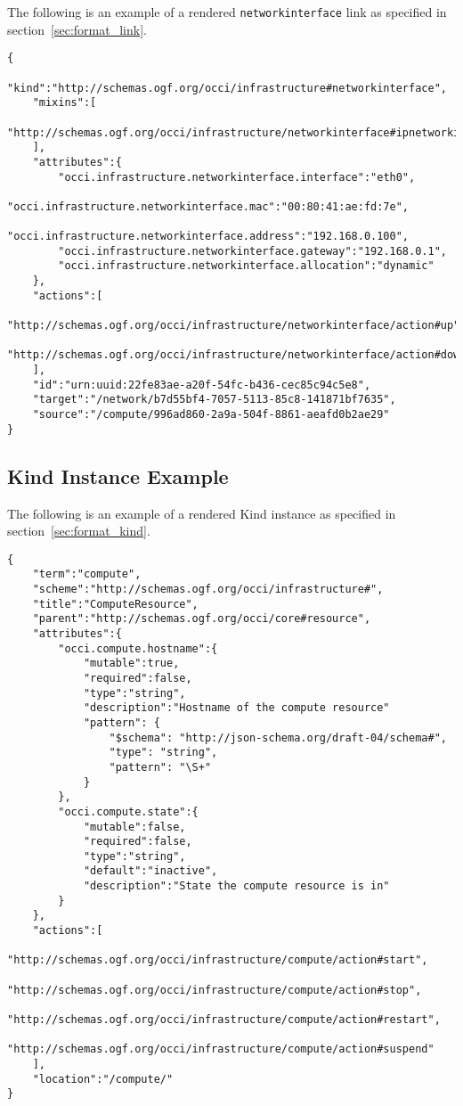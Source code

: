 \documentclass[10pt,a4paper]{article}
\begin{document}
\begin{appendices}
The following is an example of a rendered \texttt{networkinterface} link as specified in section~\ref{sec:format_link}.


\begin{lstlisting}
{
    "kind":"http://schemas.ogf.org/occi/infrastructure#networkinterface",
    "mixins":[
        "http://schemas.ogf.org/occi/infrastructure/networkinterface#ipnetworkinterface"
    ],
    "attributes":{
        "occi.infrastructure.networkinterface.interface":"eth0",
        "occi.infrastructure.networkinterface.mac":"00:80:41:ae:fd:7e",
        "occi.infrastructure.networkinterface.address":"192.168.0.100",
        "occi.infrastructure.networkinterface.gateway":"192.168.0.1",
        "occi.infrastructure.networkinterface.allocation":"dynamic"
    },
    "actions":[
        "http://schemas.ogf.org/occi/infrastructure/networkinterface/action#up",
        "http://schemas.ogf.org/occi/infrastructure/networkinterface/action#down"
    ],
    "id":"urn:uuid:22fe83ae-a20f-54fc-b436-cec85c94c5e8",
    "target":"/network/b7d55bf4-7057-5113-85c8-141871bf7635",
    "source":"/compute/996ad860-2a9a-504f-8861-aeafd0b2ae29"
}
\end{lstlisting}

\subsection{Kind Instance Example}
\label{kind_instance_rendering_example}

The following is an example of a rendered Kind instance as specified in section~\ref{sec:format_kind}.

\begin{lstlisting}
{
    "term":"compute",
    "scheme":"http://schemas.ogf.org/occi/infrastructure#",
    "title":"ComputeResource",
    "parent":"http://schemas.ogf.org/occi/core#resource",
    "attributes":{
        "occi.compute.hostname":{
            "mutable":true,
            "required":false,
            "type":"string",
            "description":"Hostname of the compute resource"
            "pattern": {
                "$schema": "http://json-schema.org/draft-04/schema#",
                "type": "string",
                "pattern": "\S+"
            }
        },
        "occi.compute.state":{
            "mutable":false,
            "required":false,
            "type":"string",
            "default":"inactive",
            "description":"State the compute resource is in"
        }
    },
    "actions":[
        "http://schemas.ogf.org/occi/infrastructure/compute/action#start",
        "http://schemas.ogf.org/occi/infrastructure/compute/action#stop",
        "http://schemas.ogf.org/occi/infrastructure/compute/action#restart",
        "http://schemas.ogf.org/occi/infrastructure/compute/action#suspend"
    ],
    "location":"/compute/"
}
\end{lstlisting}


\end{appendices}
\end{document}
